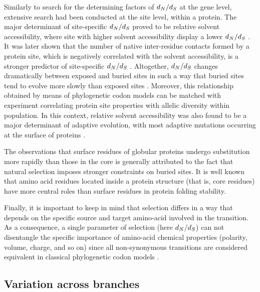 Similarly to search for the determining factors of $d_N / d_S$ at the gene level, extensive search had been conducted at the site level, within a protein.
The major determinant of site-specific $d_N / d_S$ proved to be relative solvent accessibility, where site with higher solvent accessibility display a lower $d_N / d_S$ \citep{Ramsey2011}.
It was later shown that the number of native inter-residue contacts formed by a protein site, which is negatively correlated with the solvent accessibility, is a stronger predictor of site-specific $d_N / d_S$ \citep{Yeh2013}.
Altogether, $d_N / d_S$ changes dramatically between exposed and buried sites in such a way that buried sites tend to evolve more slowly than exposed sites \citep{Echave2016}.
Moreover, this relationship obtained by means of phylogenetic \gls{codon} models can be matched with experiment correlating protein site properties with allelic diversity within population.
In this context, relative solvent accessibility was also found to be a major determinant of adaptive evolution, with most adaptive mutations occurring at the surface of proteins \citep{Moutinho2019}.

The observations that surface residues of globular proteins undergo \gls{substitution} more rapidly than those in the core is generally attributed to the fact that natural selection imposes stronger constraints on buried sites.
It is well known that amino acid residues located inside a protein structure (that is, core residues) have more central roles than surface residues in protein folding stability.

Finally, it is important to keep in mind that selection differs in a way that depends on the specific source and target amino-acid involved in the {transition}.
As a consequence, a single parameter of selection (here $d_N / d_S$) can not disentangle the specific importance of amino-acid chemical properties (polarity, volume, charge, and so on) since all non-synonymous {transitions} are considered equivalent in classical phylogenetic \gls{codon} models \citep{Dutheil2008}.

\subsection{Variation across branches}

